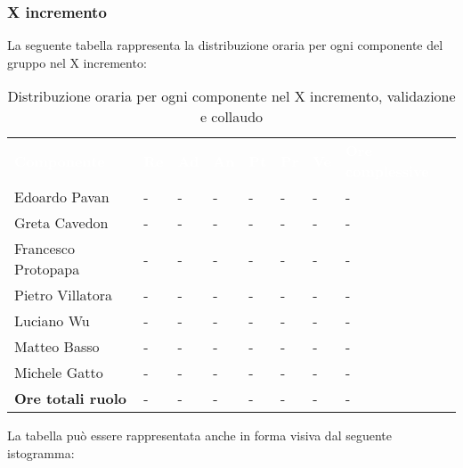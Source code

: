 \subsubsection{X incremento}
La seguente tabella rappresenta la distribuzione oraria per ogni componente del gruppo nel X incremento:
\begin{table}[!htbp]
\begin{center}
\renewcommand{\arraystretch}{1.25}
\begin{tabular}{ m{}<{\centering}  m{}<{\centering} m{}<{\centering} m{}<{\centering}  m{}<{\centering}  m{}<{\centering}  m{}<{\centering}  m{}<{\centering}   }
	\rowcolor{darkblue}
	\textcolor{white}{\textbf{Componente}} &\textcolor{white}{\textbf{Re}}&\textcolor{white}{\textbf{Ad}}&\textcolor{white}{\textbf{An}}&\textcolor{white}{\textbf{Pt}}&\textcolor{white}{\textbf{Pr}}&\textcolor{white}{\textbf{Ve}}&\textcolor{white}{\textbf{Ore complessive}}\\ 

	Edoardo Pavan & - & - & - & - & - & - & -\\	

	Greta Cavedon & - & - & - & - & - & - & -\\
	
	Francesco Protopapa & - & - & - & - & - & - & -\\
	
	Pietro Villatora & - & - & - & - & - & - & -\\
	
	Luciano Wu & - & - & - & - & - & - & -\\
	
	Matteo Basso & - & - & - & - & - & - & -\\
	
	Michele Gatto & - & - & - & - & - & - & -\\
	
	\rowcolor{gray!10} \textbf{Ore totali ruolo} & - & - & - & - & - & - & -\\

\end{tabular}
\caption{Distribuzione oraria per ogni componente nel X incremento,  validazione e collaudo}
\end{center}
\end{table}

La tabella può essere rappresentata anche in forma visiva dal seguente istogramma:

